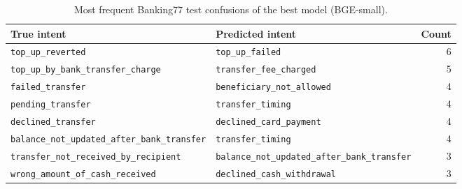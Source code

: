 \begin{table}[H]
\centering
\footnotesize
\caption{Most frequent Banking77 test confusions of the best model (BGE-small).}\label{tab:confusions}
\begin{tabular}{@{}llr@{}}
\toprule
True intent & Predicted intent & Count \\
\midrule
\texttt{top\_up\_reverted} & \texttt{top\_up\_failed} & 6 \\
\texttt{top\_up\_by\_bank\_transfer\_charge} & \texttt{transfer\_fee\_charged} & 5 \\
\texttt{failed\_transfer} & \texttt{beneficiary\_not\_allowed} & 4 \\
\texttt{pending\_transfer} & \texttt{transfer\_timing} & 4 \\
\texttt{declined\_transfer} & \texttt{declined\_card\_payment} & 4 \\
\texttt{balance\_not\_updated\_after\_bank\_transfer} & \texttt{transfer\_timing} & 4 \\
\texttt{transfer\_not\_received\_by\_recipient} & \texttt{balance\_not\_updated\_after\_bank\_transfer} & 3 \\
\texttt{wrong\_amount\_of\_cash\_received} & \texttt{declined\_cash\_withdrawal} & 3 \\
\bottomrule
\end{tabular}
\end{table}
